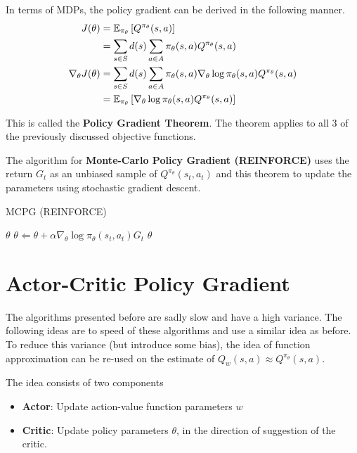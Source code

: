 In terms of MDPs, the policy gradient can be derived in the following manner.
\begin{equation}
	\begin{aligned}
		J(\theta) & = \operatorname{\mathbb{E}}_{\pi_\theta} \left[Q^{\pi_\theta}(s, a)\right]\\
				  & = \sum_{s \in S} d(s) \sum_{a \in A} \pi_\theta(s, a) Q^{\pi_\theta}(s, a)\\
		\nabla_\theta J(\theta) & = \sum_{s \in S} d(s) \sum_{a \in A} \pi_\theta (s, a) \nabla_\theta \log \pi_\theta(s, a) Q^{\pi_\theta}(s, a)\\
						 & = \operatorname{\mathbb{E}}_{\pi_\theta} \left[\nabla_\theta \log \pi_\theta(s, a) Q^{\pi_\theta}(s, a)\right]
	\end{aligned}
\end{equation}

This is called the \textbf{Policy Gradient Theorem}. The theorem applies to all 3 of the previously discussed objective functions.

The algorithm for \textbf{Monte-Carlo Policy Gradient (REINFORCE)} uses the return $G_t$ as an unbiased sample of $Q^{\pi_\theta}(s_t, a_t)$ and this theorem to update the parameters using stochastic gradient descent.
	
\begin{algorithm}[H]
	\caption{MCPG (REINFORCE)}
	\label{alg:MCPG}
	\begin{algorithmic}
		\REQUIRE $\theta$
				\STATE $\theta \Leftarrow \theta + \alpha \nabla_\theta \log \pi_\theta(s_t, a_t) G_t$
			\ENDFOR
		\ENDFOR
		\RETURN $\theta$
	\end{algorithmic}
\end{algorithm}

\section{Actor-Critic Policy Gradient}

The algorithms presented before are sadly slow and have a high variance. The following ideas are to speed of these algorithms and use a similar idea as before. To reduce this variance (but introduce some bias), the idea of function approximation can be re-used on the estimate of $Q_w(s, a) \approx Q^{\pi_\theta}(s, a)$.

The idea consists of two components
\begin{itemize}
	\item \textbf{Actor}: Update action-value function parameters $w$
	\item \textbf{Critic}: Update policy parameters $\theta$, in the direction of suggestion of the critic.
\end{itemize}

